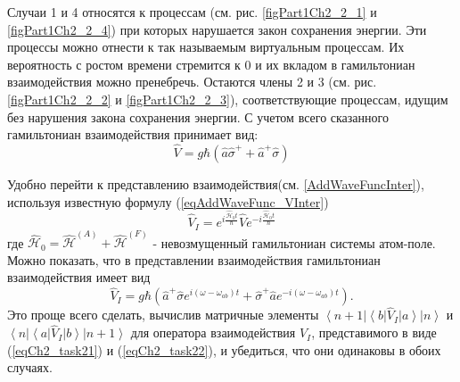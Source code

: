 Случаи 1 и 4 относятся к процессам (см. рис. \ref{figPart1Ch2_2_1} и
\ref{figPart1Ch2_2_4}) при которых нарушается закон сохранения энергии.
Эти процессы можно отнести к так называемым виртуальным процессам. Их
вероятность с ростом времени стремится к 0 и
их вкладом в гамильтониан взаимодействия можно
пренебречь. Остаются члены 2 и 3 (см. рис. \ref{figPart1Ch2_2_2} и
\ref{figPart1Ch2_2_3}), соответствующие процессам,
идущим без нарушения закона сохранения энергии. С учетом всего
сказанного гамильтониан взаимодействия принимает вид: 
\begin{equation}
\hat{V} = g \hbar \left(
\hat{a}\hat{\sigma}^{+} + 
\hat{a}^{+}\hat{\sigma}
\right)
\end{equation}

Удобно перейти к представлению взаимодействия(см. \autoref{AddWaveFuncInter}),
используя известную 
формулу (\ref{eqAddWaveFunc_VInter})
\begin{equation}
\hat{V}_I = 
e^{i \frac{\hat{\mathcal{H}}_0 t}{\hbar}}
\hat{V}
e^{- i \frac{\hat{\mathcal{H}}_0 t}{\hbar}}
\label{eqCh2_task21}
\end{equation}
где 
\(
\hat{\mathcal{H}}_0 = 
\hat{\mathcal{H}}^{\left(A\right)} +
\hat{\mathcal{H}}^{\left(F\right)}
\)
- невозмущенный гамильтониан системы атом-поле. Можно показать, что в
представлении взаимодействия гамильтониан взаимодействия имеет вид 
\begin{equation}
\hat{V}_I = 
g \hbar \left(
\hat{a}^{+}\hat{\sigma} e^{i \left(\omega - \omega_{ab}\right)t} +
\hat{\sigma}^{+} \hat{a} e^{-i \left(\omega - \omega_{ab}\right)t}
\right).
\label{eqCh2_task22}
\end{equation}
Это проще всего сделать, вычислив матричные элементы 
$\left<n +
1\right|\left<b\right|\hat{V}_I\left|a\right>\left|n\right>$ и
$\left<n\right|\left<a\right|\hat{V}_I\left|b\right>\left|n +
1\right>$ для оператора взаимодействия $\hat{V}_I$, представимого в
виде (\ref{eqCh2_task21}) и (\ref{eqCh2_task22}), и убедиться, что они
одинаковы в обоих случаях.
